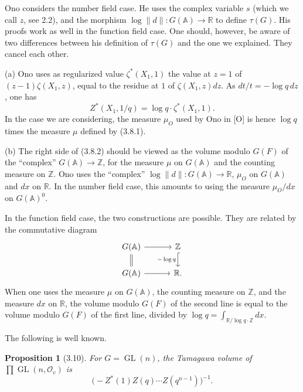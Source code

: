 \documentclass[10pt]{article}
\newcommand{\Z}{\mathbb Z}
\newcommand{\Adele}{\mathbb A}
\newcommand{\GL}{\operatorname{GL}}
\newcommand{\OO}{\mathcal O}
\theoremstyle{deligne}
\newtheorem*{proposition*}{Proposition}
\newcommand{\heading}[1]{\vspace{0.7em}\noindent{\bfseries #1}\quad}
\begin{document}
\heading{3.9. Remark.} Ono considers the number field case. He uses the complex variable $s$ (which we call $z$, see 2.2), and the morphism $\log\|d\|:G(\Adele)\to\mathbb R$ to define $\tau(G)$. His proofs work as well in the function field case. One should, however, be aware of two differences between his definition of $\tau(G)$ and the one we explained. They cancel each other.

(a) Ono uses as regularized value $\zeta^*(X_1,1)$ the value at $z=1$ of $(z-1)\zeta(X_1,z)$, equal to the residue at $1$ of $\zeta(X_1,z)dz$. As $dt/t=-\log q\,dz$, one has
\[
Z^*(X_1,1/q)=\log q\cdot\zeta^*(X_1,1).
\]
In the case we are considering, the measure $\mu_O$ used by Ono in [O] is hence $\log q$ times the measure $\mu$ defined by (3.8.1).

(b) The right side of (3.8.2) should be viewed as the volume modulo $G(F)$ of the ``complex'' $G(\Adele)\to\Z$, for the measure $\mu$ on $G(\Adele)$ and the counting measure on $\Z$. Ono uses the ``complex'' $\log\|d\|:G(\Adele)\to\mathbb R$, $\mu_O$ on $G(\Adele)$ and $dx$ on $\mathbb R$. In the number field case, this amounts to using the measure $\mu_O/dx$ on $G(\Adele)^0$.

In the function field case, the two constructions are possible. They are related by the commutative diagram
\[
\begin{tikzcd}[column sep=3.2em,row sep=1.5em]
G(\Adele) \arrow[r] \arrow[d,equal] & \Z \arrow[d,hook,"-\log q"']\\
G(\Adele) \arrow[r] & \mathbb R .
\end{tikzcd}
\]
When one uses the measure $\mu$ on $G(\Adele)$, the counting measure on $\Z$, and the measure $dx$ on $\mathbb R$, the volume modulo $G(F)$ of the second line is equal to the volume modulo $G(F)$ of the first line, divided by $\log q=\int_{\mathbb R/\log q\cdot\Z}dx$.

The following is well known.

\begin{proposition*}[3.10]
For $G=\GL(n)$, the Tamagawa volume of $\prod\GL(n,\OO_v)$ is
\[
\bigl(-Z^*(1)Z(q)\cdots Z(q^{n-1})\bigr)^{-1}.
\]
\end{proposition*}
\end{document}

